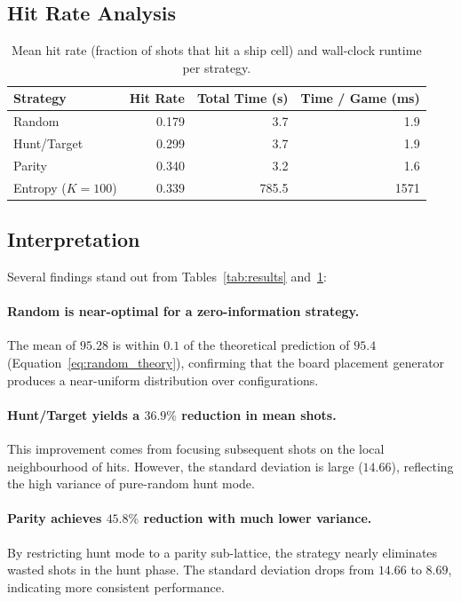 \documentclass[12pt,a4paper]{article}
\newcommand{\1}{\mathbf{1}}
\begin{document}
\subsection{Hit Rate Analysis}

\begin{table}[H]
  \centering
  \caption{Mean hit rate (fraction of shots that hit a ship cell) and wall-clock
           runtime per strategy.}
  \label{tab:hitrate}
  \begin{tabular}{lrrr}
    \toprule
    Strategy       & Hit Rate & Total Time (s) & Time / Game (ms) \\
    \midrule
    Random         & 0.179    & 3.7            & 1.9 \\
    Hunt/Target    & 0.299    & 3.7            & 1.9 \\
    Parity         & 0.340    & 3.2            & 1.6 \\
    Entropy ($K=100$) & 0.339 & 785.5          & 1571 \\
    \bottomrule
  \end{tabular}
\end{table}

\subsection{Interpretation}

Several findings stand out from Tables~\ref{tab:results} and~\ref{tab:hitrate}:

\paragraph{Random is near-optimal for a zero-information strategy.}
The mean of $95.28$ is within $0.1$ of the theoretical prediction of $95.4$
(Equation~\ref{eq:random_theory}), confirming that the board placement generator
produces a near-uniform distribution over configurations.

\paragraph{Hunt/Target yields a $36.9\%$ reduction in mean shots.}
This improvement comes from focusing subsequent shots on the local neighbourhood
of hits.  However, the standard deviation is large ($14.66$), reflecting the
high variance of pure-random hunt mode.

\paragraph{Parity achieves $45.8\%$ reduction with much lower variance.}
By restricting hunt mode to a parity sub-lattice, the strategy nearly eliminates
wasted shots in the hunt phase.  The standard deviation drops from $14.66$ to
$8.69$, indicating more consistent performance.
\end{document}
